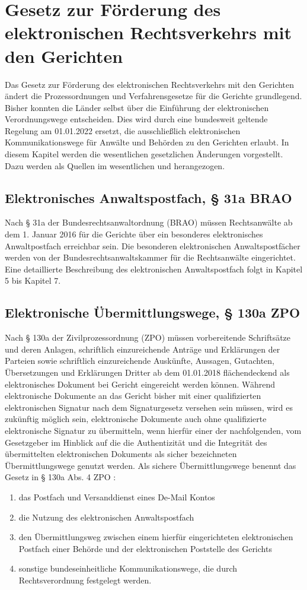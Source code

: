 \section{Gesetz zur Förderung des elektronischen Rechtsverkehrs mit den Gerichten}
Das Gesetz zur Förderung des elektronischen Rechtsverkehrs mit den Gerichten ändert die Prozessordnungen und Verfahrensgesetze für die Gerichte grundlegend. Bisher konnten die Länder selbst über die Einführung der elektronischen Verordnungswege entscheiden. Dies wird durch eine bundesweit geltende Regelung am 01.01.2022 ersetzt, die ausschließlich elektronischen Kommunikationswege für Anwälte und Behörden zu den Gerichten erlaubt. In diesem Kapitel werden die wesentlichen gesetzlichen Änderungen vorgestellt. Dazu werden als Quellen im wesentlichen \citeauthor{Gesetzfoerderungrechtsverkehr}\cite{Gesetzfoerderungrechtsverkehr} und \citeauthor{carstens2015grundlagen}\cite{carstens2015grundlagen} herangezogen.
\subsection*{Elektronisches Anwaltspostfach, § 31a BRAO}
Nach § 31a der Bundesrechtsanwaltordnung (BRAO) müssen Rechtsanwälte ab dem 1. Januar 2016 für die Gerichte über ein besonderes elektronisches Anwaltpostfach erreichbar sein. Die besonderen elektronischen Anwaltspostfächer werden von der Bundesrechtsanwaltskammer für die Rechtsanwälte eingerichtet. Eine detaillierte Beschreibung des elektronischen Anwaltspostfach folgt in Kapitel 5 bis Kapitel 7.
\subsection*{Elektronische Übermittlungswege, § 130a ZPO}
Nach § 130a der Zivilprozessordnung (ZPO) müssen vorbereitende Schriftsätze und deren Anlagen, schriftlich einzureichende Anträge und Erklärungen der Parteien sowie schriftlich einzureichende Auskünfte, Aussagen, Gutachten, Übersetzungen und Erklärungen Dritter ab dem 01.01.2018 flächendeckend als elektronisches Dokument bei Gericht eingereicht werden können. Während elektronische Dokumente an das Gericht bisher mit einer qualifizierten elektronischen Signatur nach dem Signaturgesetz versehen sein müssen, wird es zukünftig möglich sein, elektronische Dokumente auch ohne qualifizierte elektronische Signatur zu übermitteln, wenn hierfür einer der nachfolgenden, vom Gesetzgeber im Hinblick auf die die Authentizität und die Integrität des übermittelten elektronischen Dokuments als sicher bezeichneten Übermittlungswege genutzt werden. Als sichere Übermittlungswege benennt das Gesetz in § 130a Abs. 4 ZPO :
\begin{enumerate}
\item das Postfach und Versanddienst eines De-Mail Kontos
\item die Nutzung des elektronischen Anwaltspostfach 
\item den Übermittlungsweg zwischen einem hierfür eingerichteten elektronischen Postfach einer Behörde und der elektronischen Poststelle des Gerichts 
\item sonstige bundeseinheitliche Kommunikationswege, die durch Rechtsverordnung festgelegt werden.
\end{enumerate} 
